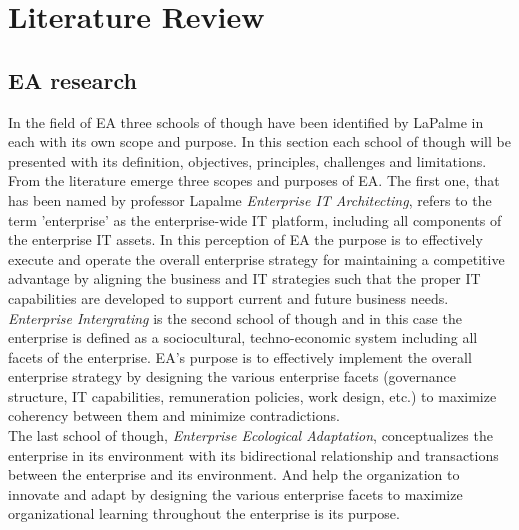 
\chapter{Literature Review} %

\label{Chapter2} %



\section{EA research}

In the field of EA three schools of though have been identified by LaPalme in \citep{lapalme2012} each with its own scope and purpose. In this section each school of though will be presented with its definition, objectives, principles, challenges and limitations. \\
From the literature emerge three scopes and purposes of EA. The first one, that has been named by professor Lapalme \textit{Enterprise IT Architecting}, refers to the term 'enterprise' as the enterprise-wide IT platform, including all components of the enterprise IT assets. In this perception of EA the purpose is to effectively execute and operate the overall enterprise strategy for maintaining a competitive advantage by aligning the business and IT strategies such that the proper IT capabilities are developed to support current and future business needs. \\
\textit{Enterprise Intergrating} is the second school of though and in this case the enterprise is defined as a sociocultural, techno-economic system including all facets of the enterprise. EA's purpose is to effectively implement the overall enterprise strategy by designing the various enterprise facets (governance structure, IT capabilities, remuneration policies, work design, etc.) to maximize coherency between them and minimize contradictions. \\
The last school of though, \textit{Enterprise Ecological Adaptation}, conceptualizes the enterprise in its environment with its bidirectional relationship and transactions between the enterprise and its environment. And help the organization to innovate and adapt by designing the various enterprise facets to maximize organizational learning throughout the enterprise is its purpose. \\

